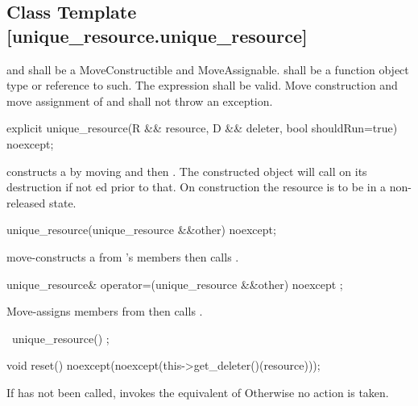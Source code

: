 \documentclass[ebook,11pt,article]{memoir}
\begin{document}
\subsection {Class Template  [unique_resource.unique_resource]}

\pnum
\requires  {} and  shall be a MoveConstructible and MoveAssignable.
 shall be a function object type or reference to such. 
The expression  shall be valid.
Move construction and move assignment of  and  shall not throw an exception.


\begin{itemdecl}
explicit
unique_resource(R && resource, D && deleter, bool shouldRun=true) noexcept;
\end{itemdecl}

\pnum
\effects constructs a  by moving  and then . The constructed object will call  on its destruction if not ed prior to that.  On construction the resource is to be in a non-released state.

\begin{itemdecl}
unique_resource(unique_resource &&other) noexcept;
\end{itemdecl}

\pnum
\effects move-constructs a  from 's members then calls .

\begin{itemdecl}
unique_resource& operator=(unique_resource  &&other) noexcept ;
\end{itemdecl}

\pnum
\effects {} Move-assigns members from  then calls .

\begin{itemdecl}
~unique_resource() ;
\end{itemdecl}

\pnum
\effects {}

\begin{itemdecl}
void reset() noexcept(noexcept(this->get_deleter()(resource)));
\end{itemdecl}

\pnum
\effects If  has not been called, invokes the equivalent of   Otherwise no action is taken.
\end{document}
